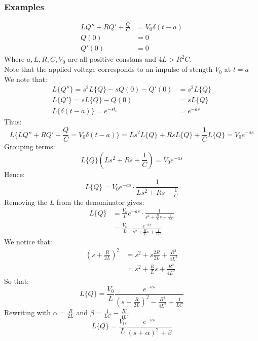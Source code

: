 \documentclass[a4paper, 10pt]{article}
\begin{document}
\subsubsection{Examples}
\begin{examplebox}
  \scriptsize
  \begin{align*}
    LQ'' + RQ' + \frac{Q}{C} & = V_0 \delta(t-a) \\
    Q(0)                     & = 0               \\
    Q'(0)                    & = 0
  \end{align*}
  Where $a,L,R,C,V_0$ are all positive constans and $4L > R^2C$. \\
  Note that the applied voltage corresponds to an impulse of stength $V_0$ at $t=a$ \\
  We note that:
  \begin{align*}
    L\{Q''\} = s^2 L\{Q\} - sQ(0) - Q'(0) & = s^2 L\{Q\} \\
    L\{Q'\} = sL\{Q\} - Q(0)              & = sL\{Q\}    \\
    L\{\delta(t-a)\} = e^{-st_0}          & = e^{-as}
  \end{align*}
  Thus:
  $$L\{LQ'' + RQ' + \frac{Q}{C} = V_0 \delta(t-a)\} = Ls^2L\{Q\} + RsL\{Q\} + \frac{1}{C}L\{Q\} = V_0 e^{-as}$$
  Grouping terms:
  $$L\{Q\}(Ls^2 + Rs + \frac{1}{C}) = V_0 e^{-as}$$
  Hence:
  $$L\{Q\} = V_0 e^{-as} \cdot \frac{1}{Ls^2 + Rs + \frac{1}{C}}$$
  Removing the $L$ from the denominator gives:
  \begin{align*}
    L\{Q\} & = \frac{V_0}{L}e^{-as} \cdot \frac{1}{s^2 + \frac{R}{L}s + \frac{1}{LC}} \\
           & =\frac{V_0}{L}\cdot \frac{e^{-as}}{s^2 + \frac{R}{L}s + \frac{1}{LC}}
  \end{align*}
  We notice that:
  \begin{align*}
    (s+\frac{R}{2L})^2 & = s^2 + s \frac{2R}{2L} + \frac{R^2}{4L^2} \\
                       & = s^2 + \frac{R}{L}s + \frac{R^2}{4L^2}
  \end{align*}
  So that:
  $$L\{Q\} = \frac{V_0}{L} \frac{e^{-as}}{(s+\frac{R}{2L})^2 - \frac{R^2}{4L^2} + \frac{1}{LC}}$$
  Rewriting with $\alpha = \frac{R}{2L}$ and $\beta = \frac{1}{LC} - \frac{R^2}{4L^2}$
  $$L\{Q\} = \frac{V_0}{L} \frac{e^{-as}}{(s+\alpha)^2 + \beta}$$


\end{examplebox}
\end{document}
